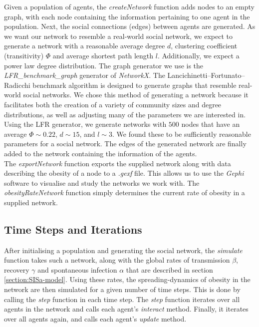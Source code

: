 \documentclass[11pt]{article}
\begin{document}
Given a population of agents, the \textit{createNetwork} function adds nodes to an empty graph, with each node containing the information pertaining to one agent in the population. Next, the social connections (edges) between agents are generated. As we want our network to resemble a real-world social network, we expect to generate a network with a reasonable average degree \(d\), clustering coefficient (transitivity) \(\Phi\) and average shortest path length \(l\). Additionally, we expect a power law degree distribution. The graph generator we use is the \textit{LFR\_benchmark\_graph} generator of \textit{NetworkX}.
The Lancichinetti–Fortunato–Radicchi benchmark algorithm is designed to generate graphs that resemble real-world social networks\cite{Lancichinetti_2008}. 
We chose this method of generating a network because it facilitates both the creation of a variety of community sizes and degree distributions, as well as adjusting many of the parameters we are interested in.
Using the LFR generator, we generate networks with \(500\) nodes that have an average \(\Phi \sim 0.22\), \(d \sim 15\), and \(l \sim 3\). We found these to be sufficiently reasonable parameters for a social network. The edges of the generated network are finally added to the network containing the information of the agents. \\

The \textit{exportNetwork} function exports the supplied network along with data describing the obesity of a node to a \textit{.gexf} file.
This allows us to use the \textit{Gephi} software to visualise and study the networks we work with. The \textit{obesityRateNetwork} function simply determines the current rate of obesity in a supplied network.

\subsection{Time Steps and Iterations} \label{section:iterations}

After initialising a population and generating the social network, the \textit{simulate} function takes such a network, along with the global rates of transmission \(\beta\), recovery \(\gamma\) and spontaneous infection \(\alpha\) that are described in section \ref{section:SISa-model}.
Using these rates,  the spreading-dynamics of obesity in the network are then simulated for a given number of time steps.
This is done by calling the \textit{step} function in each time step. The \textit{step} function iterates over all agents in the network and calls each agent's \textit{interact} method. Finally, it iterates over all agents again, and calls each agent's \textit{update} method. \\
\end{document}
